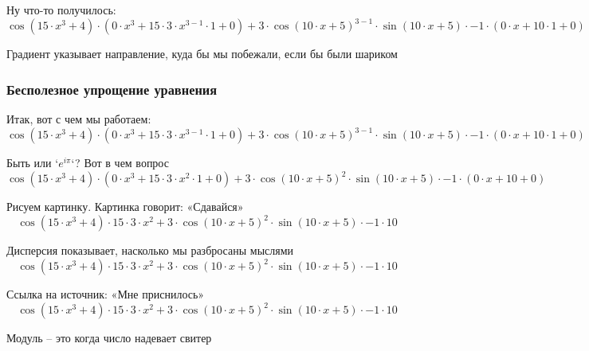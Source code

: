 \documentclass{article}
\begin{document}
Ну что-то получилось:\\
\begin{dmath*}
\cos(15 \cdot x^{3} + 4) \cdot (0 \cdot x^{3} + 15 \cdot 3 \cdot x^{3 - 1} \cdot 1 + 0) + 3 \cdot \cos(10 \cdot x + 5)^{3 - 1} \cdot \sin(10 \cdot x + 5) \cdot -1 \cdot (0 \cdot x + 10 \cdot 1 + 0)
\end{dmath*}


Градиент указывает направление, куда бы мы побежали, если бы были шариком 
\subsubsection*{Бесполезное упрощение уравнения}

Итак, вот с чем мы работаем:\\
\begin{dmath*}
\cos(15 \cdot x^{3} + 4) \cdot (0 \cdot x^{3} + 15 \cdot 3 \cdot x^{3 - 1} \cdot 1 + 0) + 3 \cdot \cos(10 \cdot x + 5)^{3 - 1} \cdot \sin(10 \cdot x + 5) \cdot -1 \cdot (0 \cdot x + 10 \cdot 1 + 0)
\end{dmath*}


Быть или `$e^{i \pi}$`? Вот в чем вопрос 
\begin{dmath*}
\cos(15 \cdot x^{3} + 4) \cdot (0 \cdot x^{3} + 15 \cdot 3 \cdot x^{2} \cdot 1 + 0) + 3 \cdot \cos(10 \cdot x + 5)^{2} \cdot \sin(10 \cdot x + 5) \cdot -1 \cdot (0 \cdot x + 10 + 0)
\end{dmath*}


Рисуем картинку. Картинка говорит: «Сдавайся» 
\begin{dmath*}
\cos(15 \cdot x^{3} + 4) \cdot 15 \cdot 3 \cdot x^{2} + 3 \cdot \cos(10 \cdot x + 5)^{2} \cdot \sin(10 \cdot x + 5) \cdot -1 \cdot 10
\end{dmath*}


Дисперсия показывает, насколько мы разбросаны мыслями 
\begin{dmath*}
\cos(15 \cdot x^{3} + 4) \cdot 15 \cdot 3 \cdot x^{2} + 3 \cdot \cos(10 \cdot x + 5)^{2} \cdot \sin(10 \cdot x + 5) \cdot -1 \cdot 10
\end{dmath*}


Ссылка на источник: «Мне приснилось» 
\begin{dmath*}
\cos(15 \cdot x^{3} + 4) \cdot 15 \cdot 3 \cdot x^{2} + 3 \cdot \cos(10 \cdot x + 5)^{2} \cdot \sin(10 \cdot x + 5) \cdot -1 \cdot 10
\end{dmath*}


Модуль – это когда число надевает свитер 
\end{document}
